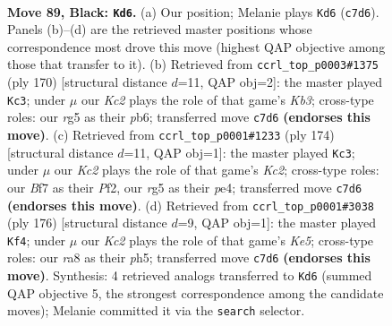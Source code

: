 \documentclass[11pt]{article}
\begin{document}
\clearpage

\begin{figure}[p]\centering
\begin{subfigure}{0.46\textwidth}\centering
\resizebox{\linewidth}{!}{%
\newchessgame
\chessboard[
  setfen={R7/2k2b1r/8/1P4R1/4K3/8/8/8 b - - 6 89},
  showmover=false,
  pgfstyle=straightmove, color=movearrow, markmove={c7-d6}
]}
\caption{}
\end{subfigure}\hfill
\begin{subfigure}{0.46\textwidth}\centering
\resizebox{\linewidth}{!}{%
\newchessgame
\chessboard[
  setfen={2k5/8/1p6/1B1R4/8/1K6/8/6r1 w - - 6 86},
  showmover=false,
  pgfstyle=straightmove, color=movearrow, markmove={b3-c3}
]}
\caption{}
\end{subfigure}
\\[4pt]
\begin{subfigure}{0.46\textwidth}\centering
\resizebox{\linewidth}{!}{%
\newchessgame
\chessboard[
  setfen={8/8/3k4/8/1r2p3/8/R1K2P2/8 w - - 2 88},
  showmover=false,
  pgfstyle=straightmove, color=movearrow, markmove={c2-c3}
]}
\caption{}
\end{subfigure}\hfill
\begin{subfigure}{0.46\textwidth}\centering
\resizebox{\linewidth}{!}{%
\newchessgame
\chessboard[
  setfen={8/8/8/2p1K2p/4B3/1R6/5k2/2r5 w - - 3 89},
  showmover=false,
  pgfstyle=straightmove, color=movearrow, markmove={e5-f4}
]}
\caption{}
\end{subfigure}
\caption{\textbf{Move 89, Black: \texttt{Kd6}.} (a) Our position; Melanie plays \texttt{Kd6} (\texttt{c7d6}). Panels (b)--(d) are the retrieved master positions whose correspondence most drove this move (highest QAP objective among those that transfer to it). (b) Retrieved from \texttt{ccrl\_top\_p0003\#1375} (ply 170) [structural distance $d$=11, QAP obj=2]: the master played \texttt{Kc3}; under $\mu$ our \emph{Kc2} plays the role of that game's \emph{Kb3}; cross-type roles: our \emph{r}g5 as their \emph{p}b6; transferred move \texttt{c7d6} \textbf{(endorses this move)}. (c) Retrieved from \texttt{ccrl\_top\_p0001\#1233} (ply 174) [structural distance $d$=11, QAP obj=1]: the master played \texttt{Kc3}; under $\mu$ our \emph{Kc2} plays the role of that game's \emph{Kc2}; cross-type roles: our \emph{B}f7 as their \emph{P}f2, our \emph{r}g5 as their \emph{p}e4; transferred move \texttt{c7d6} \textbf{(endorses this move)}. (d) Retrieved from \texttt{ccrl\_top\_p0001\#3038} (ply 176) [structural distance $d$=9, QAP obj=1]: the master played \texttt{Kf4}; under $\mu$ our \emph{Kc2} plays the role of that game's \emph{Ke5}; cross-type roles: our \emph{r}a8 as their \emph{p}h5; transferred move \texttt{c7d6} \textbf{(endorses this move)}. Synthesis: 4 retrieved analogs transferred to \texttt{Kd6} (summed QAP objective 5, the strongest correspondence among the candidate moves); Melanie committed it via the \texttt{search} selector.}
\label{fig:thought-m177}
\end{figure}
\end{document}
